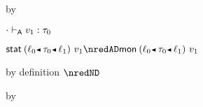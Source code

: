 {\begin{lamportproof*}
    \begin{pfproof}
      \absurdstep
        \begin{pfproof}
          by 
        \end{pfproof}
    \end{pfproof}

    \begin{pfproof}
      \absurdstep
        \begin{pfproof}
          ${\cdot} \vdash_{\mathsf{A}} v_1 : \tau_0$
        \end{pfproof}
    \end{pfproof}

    \begin{pfproof}
      \qedstep
        \begin{pfproof}
          $\estab{\obnd{\sowner_0}{\stype_0}{\sowner_1}}{\svalue_1} \nredAD \emon{\obnd{\sowner_0}{\stype_0}{\sowner_1}}{\svalue_1}$
        \end{pfproof}
    \end{pfproof}

    \begin{pfproof}
        \begin{pfproof}
          by definition $\nredND$
        \end{pfproof}
      \qedstep
        \begin{pfproof}
          by 
        \end{pfproof}
    \end{pfproof}


\end{lamportproof*}}

